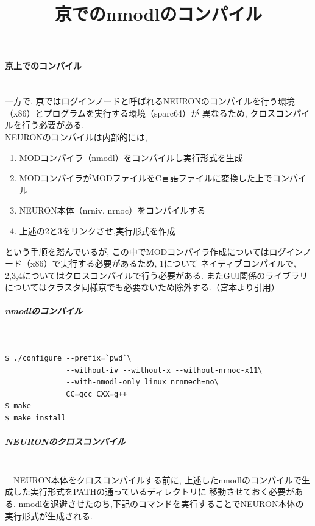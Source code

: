 \paragraph{京上でのコンパイル}~\\
一方で, 京ではログインノードと呼ばれるNEURONのコンパイルを行う環境（x86）とプログラムを実行する環境（sparc64）が
異なるため, クロスコンパイルを行う必要がある.\\
NEURONのコンパイルは内部的には,
\begin{enumerate}
\item MODコンパイラ（nmodl）をコンパイルし実行形式を生成
\item MODコンパイラがMODファイルをC言語ファイルに変換した上でコンパイル
\item NEURON本体（nrniv, nrnoc）をコンパイルする
\item 上述の2と3をリンクさせ,実行形式を作成
\end{enumerate}
という手順を踏んでいるが, この中でMODコンパイラ作成についてはログインノード（x86）で実行する必要があるため, 1について
ネイティブコンパイルで, 2,3,4についてはクロスコンパイルで行う必要がある. またGUI関係のライブラリについてはクラスタ同様京でも必要ないため除外する.（宮本\cite{miyamoto-master}より引用）\\
\subparagraph{nmodlのコンパイル}~\\
\begin{table}[htb]
  \begin{center}
  \title {京でのnmodlのコンパイル}
{\footnotesize
\begin{framed}
\begin{verbatim}
$ ./configure --prefix=`pwd`\
              --without-iv --without-x --without-nrnoc-x11\
              --with-nmodl-only linux_nrnmech=no\
              CC=gcc CXX=g++
$ make
$ make install
\end{verbatim}
\end{framed}
}
\end{center}
\end{table}

\subparagraph{NEURONのクロスコンパイル}~\\
　NEURON本体をクロスコンパイルする前に, 上述したnmodlのコンパイルで生成した実行形式をPATHの通っているディレクトリに
移動させておく必要がある. nmodlを退避させたのち,下記のコマンドを実行することでNEURON本体の実行形式が生成される.\\

